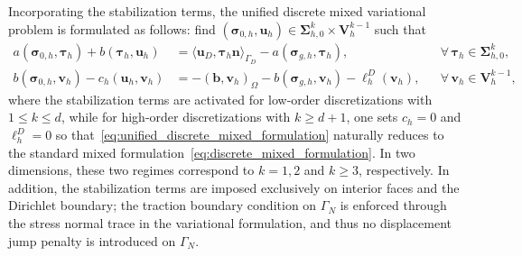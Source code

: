 Incorporating the stabilization terms, the unified discrete mixed variational problem is formulated as follows: find $(\boldsymbol{\sigma}_{0,h}, \boldsymbol{u}_h) \in \boldsymbol{\Sigma}_{h,0}^k \times \boldsymbol{V}_h^{k-1}$ such that
\begin{equation}
\label{eq:unified_discrete_mixed_formulation}
\begin{aligned}
a(\boldsymbol{\sigma}_{0,h}, \boldsymbol{\tau}_h) + b(\boldsymbol{\tau}_h, \boldsymbol{u}_h) &= \langle \boldsymbol{u}_D, \boldsymbol{\tau}_h\boldsymbol{n} \rangle_{\Gamma_D} - a(\boldsymbol{\sigma}_{g,h}, \boldsymbol{\tau}_h), && \forall\,\boldsymbol{\tau}_h \in \boldsymbol{\Sigma}_{h,0}^k, \\
b(\boldsymbol{\sigma}_{0,h}, \boldsymbol{v}_h) - c_h(\boldsymbol{u}_h, \boldsymbol{v}_h) &= -(\boldsymbol{b},\boldsymbol{v}_h)_\Omega - b(\boldsymbol{\sigma}_{g,h}, \boldsymbol{v}_h) - \ell_h^D(\boldsymbol{v}_h), && \forall\,\boldsymbol{v}_h \in \boldsymbol{V}_h^{k-1},
\end{aligned}
\end{equation}
where the stabilization terms are activated for low-order discretizations with $1 \le k \le d$, while for high-order discretizations with $k \ge d+1$, one sets $c_h = 0$ and $\ell_h^D = 0$ so that~\eqref{eq:unified_discrete_mixed_formulation} naturally reduces to the standard mixed formulation~\eqref{eq:discrete_mixed_formulation}. In two dimensions, these two regimes correspond to $k = 1, 2$ and $k \ge 3$, respectively. In addition, the stabilization terms are imposed exclusively on interior faces and the Dirichlet boundary; the traction boundary condition on $\Gamma_N$ is enforced through the stress normal trace in the variational formulation, and thus no displacement jump penalty is introduced on $\Gamma_N$.

